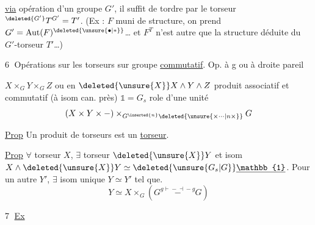 \uline{via} opération d'un groupe $G'$, il suffit de tordre par le torseur ${}^{\deleted{G'}}T^{G'}=T'$. (Ex :  $F$ muni de  structure,  on prend $G'=\operatorname{Aut}(F)^{\deleted{\unsure{\bullet|\ast}}}$\ldots{} et $F^T$ n'est autre  que la structure déduite du $G'$-torseur $T'$\ldots)

\textcircled{6} Opérations  sur les torseurs sur groupe \uline{commutatif}. Op. à g ou à droite pareil

$X\times_G Y\times_G Z$ ou en $\deleted{\unsure{X}}X\wedge Y\wedge Z$ produit associatif et commutatif (à isom can. près) $\mathbb{1}=G_s$  role d'une unité
\[
 (X\times Y\times-)\times_{G^{\inserted{n}}\deleted{\unsure{\times\cdots|n\times}}}G
\]

\uline{Prop} Un produit de torseurs est un \uline{torseur}.


\uline{Prop} $\forall$ torseur $X$, $\exists$ torseur $\deleted{\unsure{X}}Y$ et isom $X\wedge\deleted{\unsure{X}}Y\simeq\deleted{\unsure{G_s|G}}\underline{\mathbb{1}}$. Pour un autre $Y'$, $\exists$ isom unique $Y\simeq Y'$ tel que.
\[
 Y\simeq X\times_G(G\overset{g\mathrel{\vdash\!-\!\dashv}-g}{\mathrel{-}}G)
\]

\textcircled{7} \uline{Ex}  


